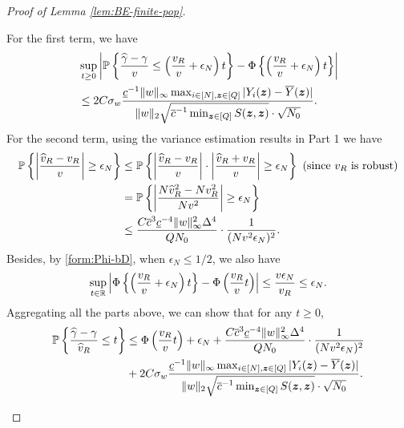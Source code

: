 \documentclass[12pt]{article}
\begin{document}
{\begin{proof}[Proof of Lemma \ref{lem:BE-finite-pop}]
\begin{enumerate}
    For the first term, we have
    \begin{align*}
        &\sup_{t\ge 0}\left|{\mathbb{P}}\left\{\frac{{\widehat{\gamma}} - \gamma}{{v}}   \le \left(\frac{{v}_R}{v} + \epsilon_N\right)t\right\} - \Phi\left\{\left(\frac{{v}_R}{v} + \epsilon_N\right)t \right\}\right| \\
        &\le 2C\sigma_w   \frac{\underline{c}^{-1}  \|w\|_{\infty}   \max_{i\in[N],{\boldsymbol{z}}\in[Q]}|Y_i({\boldsymbol{z}})-\overline{Y}({\boldsymbol{z}})|}{\|w\|_2\sqrt{\overline{c}^{-1} \min_{{\boldsymbol{z}}\in[Q]} S({\boldsymbol{z}},{\boldsymbol{z}})}\cdot \sqrt{ N_0}}.
    \end{align*}
    For the second term, using the variance estimation results in Part 1 we have
    \begin{align*}
        {\mathbb{P}}\left\{ \left|\frac{\widehat{v}_R - v_R}{v}\right| \ge \epsilon_N\right\} &\le  {\mathbb{P}}\left\{ \left|\frac{\widehat{v}_R - v_R}{v}\right|\cdot\left|\frac{\widehat{v}_R + v_R}{v}\right| \ge \epsilon_N\right\} \text{ (since $v_R$ is robust)}\\
        & =  {\mathbb{P}}\left\{ \left|\frac{N\widehat{v}^2_R - Nv^2_R}{Nv^2}\right| \ge \epsilon_N\right\}   \\
        & \le \frac{C\overline{c}^3\underline{c}^{-4} \|w\|_\infty^2 \Delta^4 }{QN_0}\cdot \frac{1}{(Nv^2\epsilon_N)^2}.
    \end{align*}
    Besides, by \eqref{form:Phi-bD}, when $\epsilon_N\le 1/2$, we also have
    \begin{align*}
        \sup_{t\in{\mathbb{R}}}\left|\Phi\left\{\left(\frac{{v}_R}{v} + \epsilon_N \right)t \right\} - \Phi\left(\frac{v_R}{v}t\right)\right| \le \frac{v\epsilon_N}{v_R} \le \epsilon_N. 
    \end{align*}
    Aggregating all the parts above, we can show that for any $t\ge 0$,
    \begin{align*}
        {\mathbb{P}}\left\{\frac{{\widehat{\gamma}} - \gamma}{\widehat{v}_R} \le t\right\} &\le \Phi\left(\frac{v_R}{v}t\right) + \epsilon_N +  \frac{C\overline{c}^3\underline{c}^{-4} \|w\|_\infty^2 \Delta^4 }{QN_0}\cdot \frac{1}{(Nv^2\epsilon_N)^2} \\
        &+ 2C\sigma_w   \frac{\underline{c}^{-1}  \|w\|_{\infty}   \max_{i\in[N],{\boldsymbol{z}}\in[Q]}|Y_i({\boldsymbol{z}})-\overline{Y}({\boldsymbol{z}})|}{\|w\|_2\sqrt{\overline{c}^{-1} \min_{{\boldsymbol{z}}\in[Q]} S({\boldsymbol{z}},{\boldsymbol{z}})}\cdot \sqrt{N_0}}.
    \end{align*}
    

\end{enumerate}
\end{proof}}
\end{document}
